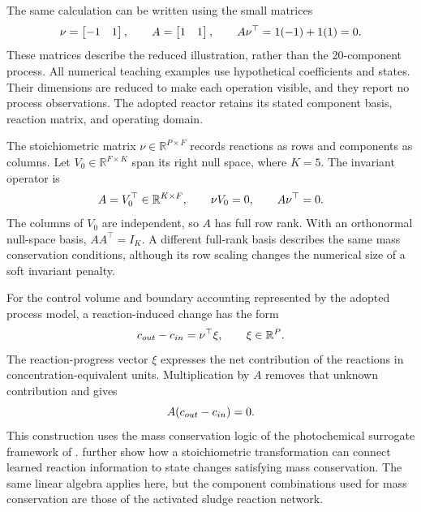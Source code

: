 The same calculation can be written using the small matrices
\begin{equation}
\equationname{Illustrative stoichiometric matrix and mass conservation operator}
\label{eq:icsor_small_inventory_matrices}
\nu=\begin{bmatrix}-1&1\end{bmatrix},
\qquad
A=\begin{bmatrix}1&1\end{bmatrix},
\qquad
A\nu^\top=1(-1)+1(1)=0.
\end{equation}
These matrices describe the reduced illustration, rather than the 20-component process. All numerical teaching examples use hypothetical coefficients and states. Their dimensions are reduced to make each operation visible, and they report no process observations. The adopted reactor retains its stated component basis, reaction matrix, and operating domain.

The stoichiometric matrix \(\nu\in\mathbb{R}^{P\times F}\) records reactions as rows and components as columns. Let \(V_0\in\mathbb{R}^{F\times K}\) span its right null space, where \(K=5\). The invariant operator is
\begin{equation}
\equationname{Structured-regression mass conservation operator from the null space}
\label{eq:icsor_invariant_operator}
A=V_0^\top\in\mathbb{R}^{K\times F},
\qquad \nu V_0=0,
\qquad A\nu^\top=0.
\end{equation}
The columns of \(V_0\) are independent, so \(A\) has full row rank. With an orthonormal null-space basis, \(AA^\top=I_K\). A different full-rank basis describes the same mass conservation conditions, although its row scaling changes the numerical size of a soft invariant penalty.

For the control volume and boundary accounting represented by the adopted process model, a reaction-induced change has the form
\begin{equation}
\equationname{Effluent change in stoichiometric process coordinates}
\label{eq:icsor_stoichiometric_change}
c_{out}-c_{in}=\nu^\top\xi,
\qquad \xi\in\mathbb{R}^{P}.
\end{equation}
The reaction-progress vector \(\xi\) expresses the net contribution of the reactions in concentration-equivalent units. Multiplication by \(A\) removes that unknown contribution and gives
\begin{equation}
\equationname{Mass conservation equality for the structured-regression effluent}
\label{eq:icsor_invariant_balance}
A(c_{out}-c_{in})=0.
\end{equation}
This construction uses the mass conservation logic of the photochemical surrogate framework of \citet{SturmWexler2020}. \citet{SturmWexler2022} further show how a stoichiometric transformation can connect learned reaction information to state changes satisfying mass conservation. The same linear algebra applies here, but the component combinations used for mass conservation are those of the activated sludge reaction network.

